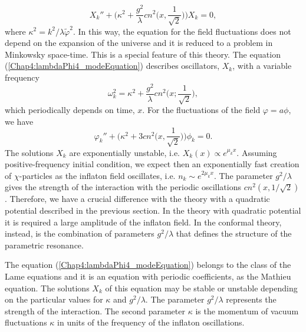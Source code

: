 \documentclass[11pt,a4paper,twoside]{book}
\begin{document}
\begin{equation}
\label{Chap4:lambdaPhi4_modeEquation}
X_{k}'' + \Bigg(\kappa^{2} + \frac{g^{2}}{\lambda}cn^{2}\Bigg(x,\frac{1}{\sqrt{2}}\Bigg)\Bigg)X_{k} = 0,
\end{equation}
where $\kappa^{2}=k^{2}/\lambda \tilde{\varphi}^{2}$. In this way, the equation for the field fluctuations does not depend on the expansion of the universe and it is reduced to a problem in Minkowsky space-time. This is a special feature of this theory. The equation (\ref{Chap4:lambdaPhi4_modeEquation}) describes oscillators, $ X_{k} $, with a variable frequency
\begin{equation}
\label{Chap4:lambdaPhi4_frequency}
\omega^{2}_{k}=\kappa^{2} + \frac{g^{2}}{\lambda}cn^{2}\Bigg(x;\frac{1}{\sqrt{2}}\Bigg),
\end{equation}
which periodically depends on time, $ x $. For the fluctuations of the field $ \varphi = a\phi $, we have
\begin{equation}
\label{Chap4:lambdaPhi4}
\varphi_{k}'' + \Bigg(\kappa^{2} + 3cn^{2}\Bigg(x,\frac{1}{\sqrt{2}}\Bigg)\Bigg)\phi_{k} = 0.
\end{equation}
The solutions $ X_{k} $ are exponentially unstable, i.e. $ X_{k}(x) \propto e^{\mu_{k}x} $. Assuming positive-frequency initial condition, we expect then an exponentially fast creation of $\chi$-particles as the inflaton field oscillates, i.e. $ n_{k} \sim e^{2\mu_{k}x} $. The parameter $ g^{2}/\lambda $ gives the strength of the interaction with the periodic oscillations $ cn^{2}(x,1/\sqrt{2}) $. Therefore, we have a crucial difference with the theory with a quadratic potential described in the previous section. In the theory with quadratic potential it is required a large amplitude of the inflaton field. In the conformal theory, instead, is the combination of parameters $ g^{2}/\lambda $ that defines the structure of the parametric resonance.

The equation (\ref{Chap4:lambdaPhi4_modeEquation}) belongs to the class of the Lame equations and it is an equation with periodic coefficients, as the Mathieu equation. The solutions $ X_{k} $ of this equation may be stable or unstable depending on the particular values for $ \kappa $ and $ g^{2}/\lambda $. The parameter $ g^{2}/\lambda  $ represents the strength of the interaction. The second parameter $\kappa$ is the momentum of vacuum fluctuations $\kappa$ in units of the frequency of the inflaton oscillations.
\end{document}
